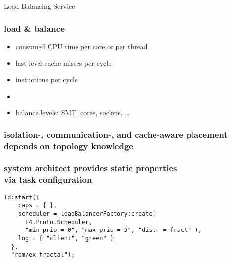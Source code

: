 \documentclass[utf8,10pt,aspectratio=169]{beamer}
\begin{document}

\begin{frame}
  \centering
  \Large
  Load Balancing Service
\end{frame}


\begin{frame}
  \frametitle{load \& balance}
  \centering
  \begin{itemize}
  \setlength{\itemsep}{6pt}
    \item consumed CPU time per core or per thread
    \item last-level cache misses per cycle
    \item instuctions per cycle
    \item
    \item balance levels: SMT, cores, sockets, \ldots
  \end{itemize}
\end{frame}


\begin{frame}
  \frametitle{isolation-, communication-, and cache-aware placement depends on
  topology knowledge}
  \centering
%    
    
\end{frame}


\begin{frame}[fragile]
  \frametitle{system architect provides static properties\\ via task configuration}
  \centering
  \begin{minipage}[c]{\columnwidth}
    \begin{verbatim}
ld:start({
    caps = { },
    scheduler = loadBalancerFactory:create(
      L4.Proto.Scheduler,
      "min_prio = 0", "max_prio = 5", "distr = fract" ),
    log = { "client", "green" }
  },
  "rom/ex_fractal");
    \end{verbatim}
  \end{minipage}
\end{frame}
\end{document}

